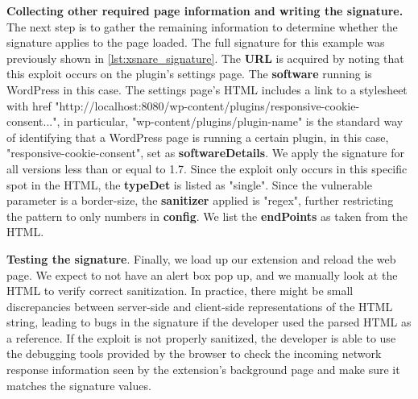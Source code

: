 \textbf{Collecting other required page information and writing the signature.} The next step is to gather the remaining information to determine whether the signature applies to the page loaded. The full signature for this example was previously shown in \autoref{lst:xsnare_signature}. The \textbf{URL} is acquired by noting that this exploit occurs on the plugin's settings page. The \textbf{software} running is WordPress in this case. The settings page's HTML includes a link to a stylesheet with href "http://localhost:8080/wp-content/plugins/responsive-cookie-consent...", in particular, "wp-content/plugins/plugin-name" is the standard way of identifying that a WordPress page is running a certain plugin, in this case, "responsive-cookie-consent", set as \textbf{softwareDetails}. We apply the signature for all versions less than or equal to 1.7. Since the exploit only occurs in this specific spot in the HTML, the \textbf{typeDet} is listed as "single". 
Since the vulnerable parameter is a border-size, the \textbf{sanitizer} applied is "regex", further restricting the pattern to only numbers in \textbf{config}. We list the \textbf{endPoints} as taken from the HTML.

\textbf{Testing the signature}. Finally, we load up our extension and reload the web page. We expect to not have an alert box pop up, and we manually look at the HTML to verify correct sanitization. In practice, there might be small discrepancies between server-side and client-side representations of the HTML string, leading to bugs in the signature if the developer used the parsed HTML as a reference. If the exploit is not properly sanitized, the developer is able to use the debugging tools provided by the browser to check the incoming network response information seen by the extension's background page and make sure it matches the signature values.

\iffalse
